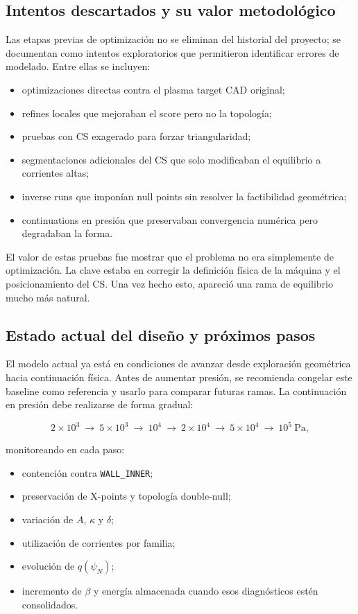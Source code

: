 \documentclass[11pt,a4paper]{article}
\begin{document}
\subsection{Intentos descartados y su valor metodológico}
Las etapas previas de optimización no se eliminan del historial del proyecto; se documentan
como intentos exploratorios que permitieron identificar errores de modelado. Entre ellas se
incluyen:

\begin{itemize}
    \item optimizaciones directas contra el plasma target CAD original;
    \item refines locales que mejoraban el score pero no la topología;
    \item pruebas con CS exagerado para forzar triangularidad;
    \item segmentaciones adicionales del CS que solo modificaban el equilibrio a corrientes altas;
    \item inverse runs que imponían null points sin resolver la factibilidad geométrica;
    \item continuations en presión que preservaban convergencia numérica pero degradaban la forma.
\end{itemize}

El valor de estas pruebas fue mostrar que el problema no era simplemente de optimización. La
clave estaba en corregir la definición física de la máquina y el posicionamiento del CS. Una vez
hecho esto, apareció una rama de equilibrio mucho más natural.

\subsection{Estado actual del diseño y próximos pasos}
El modelo actual ya está en condiciones de avanzar desde exploración geométrica hacia
continuación física. Antes de aumentar presión, se recomienda congelar este baseline como
referencia y usarlo para comparar futuras ramas. La continuación en presión debe realizarse de
forma gradual:

\[
2\times10^3\ \rightarrow\ 5\times10^3\ \rightarrow\ 10^4\ \rightarrow\ 2\times10^4\ \rightarrow\ 5\times10^4\ \rightarrow\ 10^5~\mathrm{Pa},
\]

monitoreando en cada paso:

\begin{itemize}
    \item contención contra \texttt{WALL\_INNER};
    \item preservación de X-points y topología double-null;
    \item variación de $A$, $\kappa$ y $\delta$;
    \item utilización de corrientes por familia;
    \item evolución de $q(\psi_N)$;
    \item incremento de $\beta$ y energía almacenada cuando esos diagnósticos estén consolidados.
\end{itemize}
\end{document}
